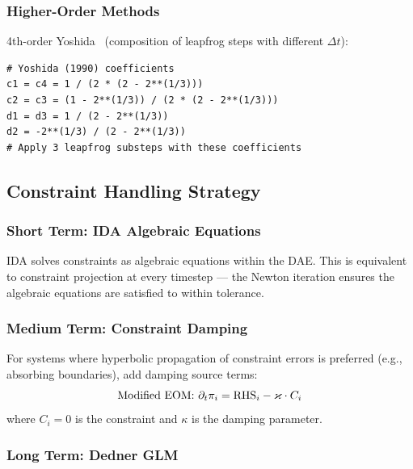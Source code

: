 \subsubsection{Higher-Order Methods}
\label{sec:higher-order}

4th-order Yoshida~\cite{yoshida1990symplectic} (composition of leapfrog steps with different $\Delta t$):

\begin{lstlisting}[style=python]
# Yoshida (1990) coefficients
c1 = c4 = 1 / (2 * (2 - 2**(1/3)))
c2 = c3 = (1 - 2**(1/3)) / (2 * (2 - 2**(1/3)))
d1 = d3 = 1 / (2 - 2**(1/3))
d2 = -2**(1/3) / (2 - 2**(1/3))
# Apply 3 leapfrog substeps with these coefficients
\end{lstlisting}

\subsection{Constraint Handling Strategy}
\label{sec:constraint-handling}

\subsubsection{Short Term: IDA Algebraic Equations}
\label{sec:constraint-ida}

IDA solves constraints as algebraic equations within the DAE. This is equivalent
to constraint projection at every timestep --- the Newton iteration ensures the
algebraic equations are satisfied to within tolerance.

\subsubsection{Medium Term: Constraint Damping}
\label{sec:constraint-damping}

For systems where hyperbolic propagation of constraint errors is preferred
(e.g., absorbing boundaries), add damping source terms:
\begin{equation}
  \text{Modified EOM: } \partial_t \pi_i = \mathrm{RHS}_i - \varkappa \cdot C_i
  \label{eq:constraint-damping}
\end{equation}
where $C_i = 0$ is the constraint and $\kappa$ is the damping parameter.

\subsubsection{Long Term: Dedner GLM}
\label{sec:dedner-glm}

